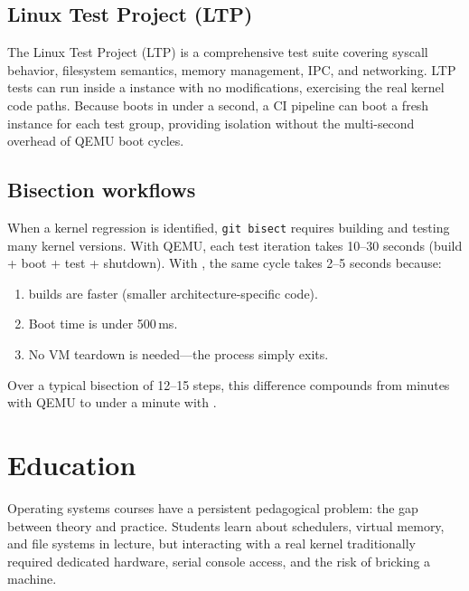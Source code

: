 \subsection{Linux Test Project (LTP)}

The Linux Test Project (LTP) is a comprehensive test suite covering
syscall behavior, filesystem semantics, memory management, IPC, and
networking.  LTP tests can run inside a \UML{} instance with no
modifications, exercising the real kernel code paths.  Because \UML{}
boots in under a second, a CI pipeline can boot a fresh \UML{} instance
for each test group, providing isolation without the multi-second
overhead of QEMU boot cycles.

\subsection{Bisection workflows}

When a kernel regression is identified, \texttt{git bisect} requires
building and testing many kernel versions.  With QEMU, each test
iteration takes 10--30 seconds (build + boot + test + shutdown).
With \UML{}, the same cycle takes 2--5 seconds because:

\begin{enumerate}[leftmargin=2em]
  \item \UML{} builds are faster (smaller architecture-specific code).
  \item Boot time is under 500\,ms.
  \item No VM teardown is needed---the process simply exits.
\end{enumerate}

Over a typical bisection of 12--15 steps, this difference compounds
from minutes with QEMU to under a minute with \UML{}.


\section{Education}
\label{sec:app-education}

Operating systems courses have a persistent pedagogical problem: the
gap between theory and practice.  Students learn about schedulers,
virtual memory, and file systems in lecture, but interacting with a
real kernel traditionally required dedicated hardware, serial console
access, and the risk of bricking a machine.

